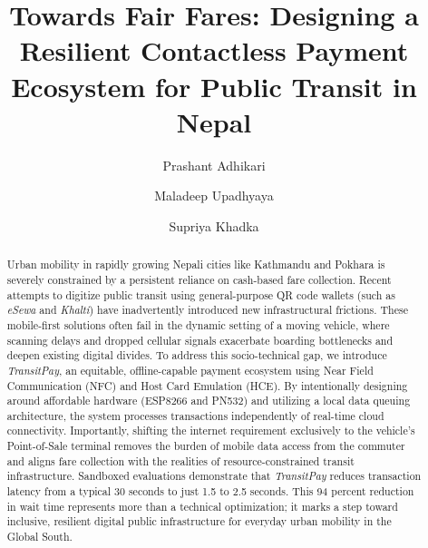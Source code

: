 \documentclass[manuscript,review,anonymous]{acmart}
\begin{document}
\title{Towards Fair Fares: Designing a Resilient Contactless Payment Ecosystem for Public Transit in Nepal}

\author{Prashant Adhikari}

\author{Maladeep Upadhyaya}


\author{Supriya Khadka}

\renewcommand{\shortauthors}{Adhikari et al.}

\begin{abstract}
Urban mobility in rapidly growing Nepali cities like Kathmandu and Pokhara is severely constrained by a persistent reliance on cash-based fare collection. Recent attempts to digitize public transit using general-purpose QR code wallets (such as \textit{eSewa} and \textit{Khalti}) have inadvertently introduced new infrastructural frictions. These mobile-first solutions often fail in the dynamic setting of a moving vehicle, where scanning delays and dropped cellular signals exacerbate boarding bottlenecks and deepen existing digital divides. To address this socio-technical gap, we introduce \emph{TransitPay}, an equitable, offline-capable payment ecosystem using Near Field Communication (NFC) and Host Card Emulation (HCE). By intentionally designing around affordable hardware (ESP8266 and PN532) and utilizing a local data queuing architecture, the system processes transactions independently of real-time cloud connectivity. Importantly, shifting the internet requirement exclusively to the vehicle's Point-of-Sale terminal removes the burden of mobile data access from the commuter and aligns fare collection with the realities of resource-constrained transit infrastructure. Sandboxed evaluations demonstrate that \emph{TransitPay} reduces transaction latency from a typical 30 seconds to just 1.5 to 2.5 seconds. This 94 percent reduction in wait time represents more than a technical optimization; it marks a step toward inclusive, resilient digital public infrastructure for everyday urban mobility in the Global South.
\end{abstract}
\end{document}
